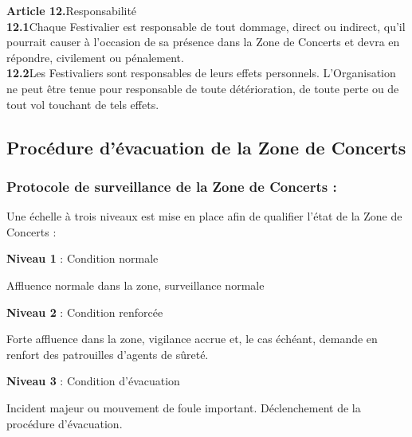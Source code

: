 \documentclass[hidelinks, paper=a4, fontsize=13pt]{report}
\begin{document}
\textbf{Article 12.}\hspace{3mm}Responsabilité\\
\textbf{12.1}\hspace{3mm}Chaque Festivalier est responsable de tout dommage, direct ou indirect, qu’il pourrait causer à l’occasion de sa présence dans la Zone de Concerts et devra en répondre, civilement ou pénalement.\\
\textbf{12.2}\hspace{3mm}Les Festivaliers sont responsables de leurs effets personnels. L’Organisation ne peut être tenue pour responsable de toute détérioration, de toute perte ou de tout vol touchant de tels effets. 

\newpage


\subsection{Procédure d’évacuation de la Zone de Concerts}
\label{refEvacuation}

\subsubsection{Protocole de surveillance de la Zone de Concerts :}

Une échelle à trois niveaux est mise en place afin de qualifier l’état de la Zone de Concerts :
\begin{list}{•}{}
	\item \textbf{Niveau 1} : Condition normale
\end{list}

Affluence normale dans la zone, surveillance normale
\begin{list}{•}{}
	\item \textbf{Niveau 2} : Condition renforcée
\end{list}

Forte affluence dans la zone, vigilance accrue et, le cas échéant, demande en renfort des patrouilles d’agents de sûreté.

\begin{list}{•}{}
	\item \textbf{Niveau 3} : Condition d’évacuation
\end{list}

Incident majeur ou mouvement de foule important. Déclenchement de la procédure d’évacuation.
\end{document}
